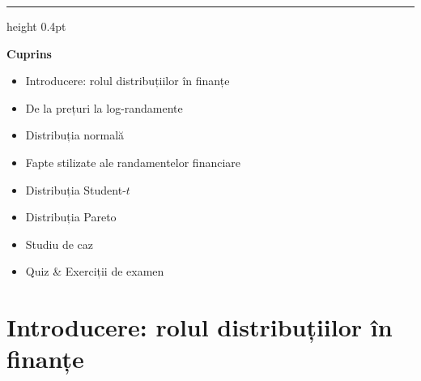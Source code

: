 \documentclass[9pt, aspectratio=169, t]{beamer}
\theoremstyle{definition}
\begin{document}
{
\begin{frame}{}
    {\color{FooterGray}\hrule height 0.4pt}
    \vspace{0.1cm}
    {\Large\textcolor{IDAred}{\textbf{Cuprins}}}
    \vspace{0.2cm}
    {\small
    \begin{itemize}
        \item Introducere: rolul distribuțiilor în finanțe
        \item De la prețuri la log-randamente
        \item Distribuția normală
        \item Fapte stilizate ale randamentelor financiare
        \item Distribuția Student-$t$
        \item Distribuția Pareto
        \item Studiu de caz
        \item Quiz \& Exerciții de examen
    \end{itemize}
    }
\end{frame}
}
\section{Introducere: rolul distribuțiilor în finanțe}
\end{document}
